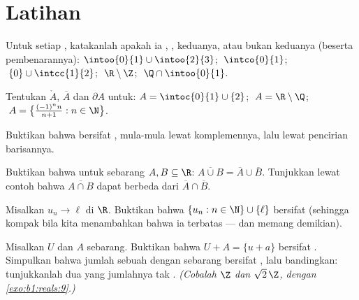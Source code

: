 \section{Latihan}

\begin{exercise}[$\star$]\label{exo:b1:topology:1}
Untuk setiap , katakanlah apakah ia , , keduanya, atau bukan keduanya (beserta
pembenarannya): $\intoo{0}{1} \cup \intoo{2}{3}$; $\;\intco{0}{1}$;
$\;\{0\} \cup \intcc{1}{2}$; $\;\R \setminus \Z$; $\;\Q \cap
\intoo{0}{1}$.
\end{exercise}

\begin{exercise}[$\star$]\label{exo:b1:topology:2}
Tentukan $\mathring A$, $\overline A$ dan $\partial A$ untuk:
$A = \intoc{0}{1} \cup \{2\}$; $\;A = \R \setminus \Q$;
$\;A = \bigl\{\frac{(-1)^n n}{n+1} : n \in \N\bigr\}$.
\end{exercise}

\begin{exercise}[$\star$]\label{exo:b1:topology:3}
Buktikan bahwa  bersifat , mula-mula lewat komplemennya, lalu lewat
pencirian barisannya.
\end{exercise}

\begin{exercise}[$\star$]\label{exo:b1:topology:4}
Buktikan bahwa untuk sebarang $A, B \subseteq \R$: $\overline{A \cup B} =
\overline A \cup \overline B$. Tunjukkan lewat contoh bahwa
$\overline{A \cap B}$ dapat berbeda dari $\overline A \cap \overline
B$.
\end{exercise}

\begin{exercise}[$\star\star$]\label{exo:b1:topology:5}
Misalkan $u_n \to \ell$ di $\R$. Buktikan bahwa  $\{u_n : n \in \N\}
\cup \{\ell\}$ bersifat  (sehingga kompak bila kita menambahkan bahwa ia
terbatas --- dan memang demikian).
\end{exercise}

\begin{exercise}[$\star\star$]\label{exo:b1:topology:6}
Misalkan $U$  dan $A$ sebarang. Buktikan bahwa $U + A = \{u + a\}$ bersifat
. Simpulkan bahwa jumlah sebuah  dengan sebarang  bersifat , lalu
bandingkan: tunjukkanlah dua  \emph{} yang jumlahnya tak .
\emph{(Cobalah $\Z$ dan $\sqrt 2\,\Z$, dengan \cref{exo:b1:reals:9}.)}
\end{exercise}

